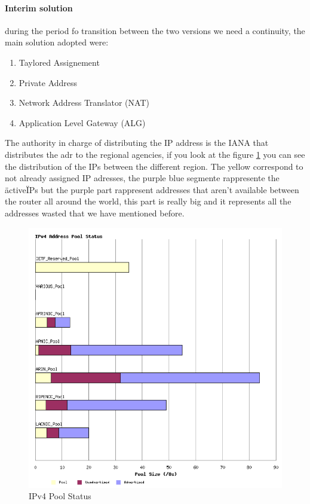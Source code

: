 \documentclass[12pt]{article}
\begin{document}
\paragraph{Interim solution} during the period fo transition between the two versions we need a continuity, the main solution adopted were:
\begin{enumerate}
  \item Taylored Assignement
  \item Private Address
  \item Network Address Translator (NAT)
  \item Application Level Gateway (ALG)
\end{enumerate}
The authority in charge of distributing the IP address is the IANA that distributes the adr to the regional agencies, if you look at the figure \ref{fig:wastedIP} you can see the distribution of the IPs between the different region. The yellow correspond to not already assigned IP adresses, the purple blue segmente rappresente the \"active\" IPs but the purple part rappresent addresses that aren't available between the router all around the world, this part is really big and it represents all the addresses wasted that we have mentioned before.
\begin{figure}[h!]
  \includegraphics[width=\linewidth]{images/wasteIP.png}
  \caption{IPv4 Pool Status}
  \label{fig:wastedIP}
\end{figure}



\end{document}
